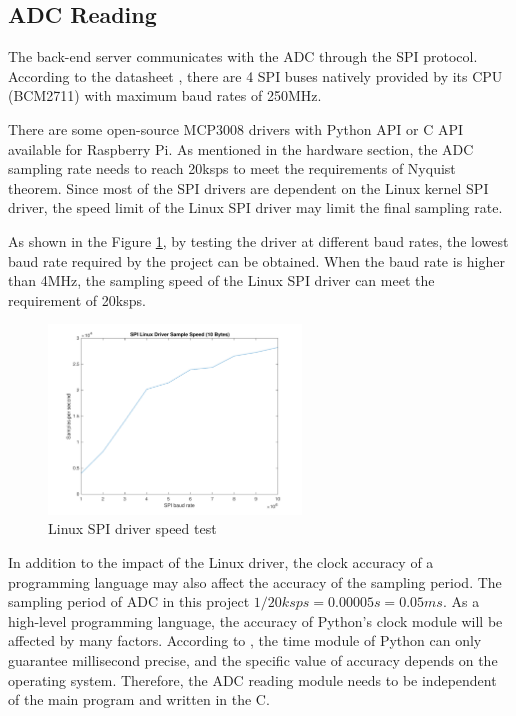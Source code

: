 \subsection{ADC Reading}
The back-end server communicates with the ADC through the SPI protocol. According to the datasheet  \textcite{raspberrypi}, there are 4 SPI buses natively provided by its CPU (BCM2711) with maximum baud rates of 250MHz. 
\par
There are some open-source MCP3008 drivers with Python API or C API available for Raspberry Pi. As mentioned in the hardware section, the ADC sampling rate needs to reach 20ksps to meet the requirements of Nyquist theorem. Since most of the SPI drivers are dependent on the Linux kernel SPI driver, the speed limit of the Linux SPI driver may limit the final sampling rate.
\par
As shown in the Figure \ref{fig:spi}, by testing the driver at different baud rates, the lowest baud rate required by the project can be obtained. When the baud rate is higher than 4MHz, the sampling speed of the Linux SPI driver can meet the requirement of 20ksps.
\begin{figure}[H]
    \centering
    \includegraphics[width=0.6\textwidth]{figure/spi_linux.pdf}
    \caption{Linux SPI driver speed test}
    \label{fig:spi}
\end{figure}
In addition to the impact of the Linux driver, the clock accuracy of a programming language may also affect the accuracy of the sampling period. The sampling period of ADC in this project $ 1/20ksps=0.00005s=0.05ms$. As a high-level programming language, the accuracy of Python’s clock module will be affected by many factors. According to \textcite{python}, the time module of Python can only guarantee millisecond precise, and the specific value of accuracy depends on the operating system. Therefore, the ADC reading module needs to be independent of the main program and written in the C.
\par
